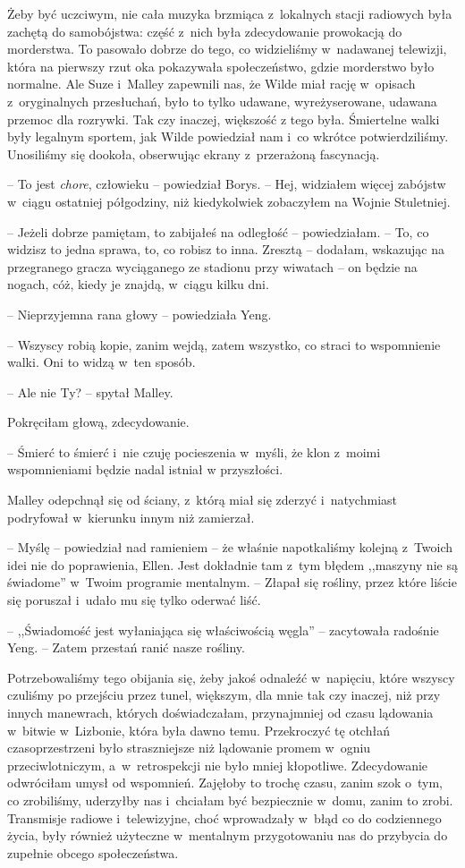 \documentclass[oneside,polish,11pt,sfheadings]{mwbk}
\begin{document}
Żeby być uczciwym, nie cała muzyka brzmiąca z~lokalnych stacji radiowych
była zachętą do samobójstwa: część z~nich była zdecydowanie prowokacją
do morderstwa. To pasowało dobrze do tego, co widzieliśmy w~nadawanej
telewizji, która na pierwszy rzut oka pokazywała społeczeństwo, gdzie
morderstwo było normalne. Ale Suze i~Malley zapewnili nas, że Wilde miał
rację w~opisach z~oryginalnych przesłuchań, było to tylko udawane,
wyreżyserowane, udawana przemoc dla rozrywki. Tak czy inaczej, większość
z tego była. Śmiertelne walki były legalnym sportem, jak Wilde
powiedział nam i~co wkrótce potwierdziliśmy. Unosiliśmy się dookoła,
obserwując ekrany z~przerażoną fascynacją.

-- To jest \textit{chore}, człowieku -- powiedział Borys. -- Hej, widziałem
więcej zabójstw w~ciągu ostatniej półgodziny, niż kiedykolwiek
zobaczyłem na Wojnie Stuletniej.

-- Jeżeli dobrze pamiętam, to zabijałeś na odległość -- powiedziałam. -- To, co widzisz to jedna sprawa, to, co robisz to inna. Zresztą -- dodałam, wskazując na przegranego gracza wyciąganego ze stadionu przy
wiwatach -- on będzie na nogach, cóż, kiedy je znajdą, w~ciągu kilku dni.

-- Nieprzyjemna rana głowy -- powiedziała Yeng.

-- Wszyscy robią kopie, zanim wejdą, zatem wszystko, co straci to
wspomnienie walki. Oni to widzą w~ten sposób.

-- Ale nie Ty? -- spytał Malley.

Pokręciłam głową, zdecydowanie. 

-- Śmierć to śmierć i~nie czuję
pocieszenia w~myśli, że klon z~moimi wspomnieniami będzie nadal istniał
w przyszłości.

Malley odepchnął się od ściany, z~którą miał się zderzyć i~natychmiast
podryfował w~kierunku innym niż zamierzał.

-- Myślę -- powiedział nad ramieniem -- że właśnie napotkaliśmy kolejną z~Twoich idei nie do poprawienia, Ellen. Jest dokładnie tam z~tym błędem
,,maszyny nie są świadome'' w~Twoim programie mentalnym. -- Złapał się
rośliny, przez które liście się poruszał i~udało mu się tylko oderwać
liść.

-- ,,Świadomość jest wyłaniająca się właściwością węgla'' -- zacytowała
radośnie Yeng. -- Zatem przestań ranić nasze rośliny.

Potrzebowaliśmy tego obijania się, żeby jakoś odnaleźć w~napięciu, które
wszyscy czuliśmy po przejściu przez tunel, większym, dla mnie tak czy
inaczej, niż przy innych manewrach, których doświadczałam, przynajmniej
od czasu lądowania w~bitwie w~Lizbonie, która była dawno temu.
Przekroczyć tę otchłań czasoprzestrzeni było straszniejsze niż lądowanie
promem w~ogniu przeciwlotniczym, a~w~retrospekcji nie było mniej
kłopotliwe. Zdecydowanie odwróciłam umysł od wspomnień. Zajęłoby to
trochę czasu, zanim szok o~tym, co zrobiliśmy, uderzyłby nas i~chciałam
być bezpiecznie w~domu, zanim to zrobi. Transmisje radiowe i~telewizyjne, choć wprowadzały w~błąd co do codziennego życia, były
również użyteczne w~mentalnym przygotowaniu nas do przybycia do zupełnie
obcego społeczeństwa.
\end{document}
